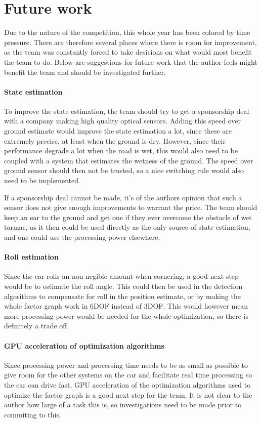 \chapter{Future work}
Due to the nature of the competition, this whole year has been colored by time pressure. There are therefore several places where there is room for improvement, as the team was constantly forced to take desicions on what would most benefit the team to do. Below are suggestions for future work that the author feels might benefit the team and should be investigated further.

\subsubsection{State estimation}
To improve the state estimation, the team should try to get a sponsorship deal with a company making high quality optical sensors. Adding this speed over ground estimate would improve the state estimation a lot, since these are extremely precise, at least when the ground is dry. However, since their performance degrade a lot when the road is wet, this would also need to be coupled with a system that estimates the wetness of the ground. The speed over ground sensor should then not be trusted, so a nice switching rule would also need to be implemented. 

If a sponsorship deal cannot be made, it's of the authors opinion that such a sensor does not give enough improvements to warrant the price. The team should keep an ear to the ground and get one if they ever overcome the obstacle of wet tarmac, as it then could be used directly as the only source of state estimation, and one could use the processing power elsewhere.

\subsubsection{Roll estimation}
Since the car rolls an non negible amount when cornering, a good next step would be to estimate the roll angle. This could then be used in the detection algorithms to compensate for roll in the position estimate, or by making the whole factor graph work in 6DOF instead of 3DOF. This would however mean more processing power would be needed for the whole optimization, so there is definitely a trade off.

\subsubsection{GPU acceleration of optimization algorithms}
Since processing power and processing time needs to be as small as possible to give room for the other systems on the car and facilitate real time processing so the car can drive fast, GPU acceleration of the optimization algorithms used to optimize the factor graph is a good next step for the team. It is not clear to the author how large of a task this is, so investigations need to be made prior to commiting to this.

